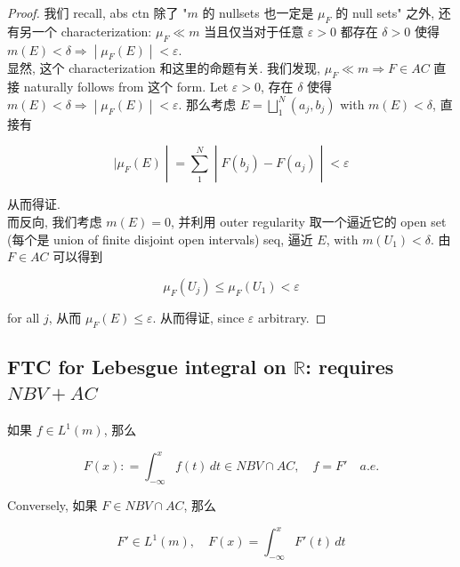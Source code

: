\begin{proof}

我们 recall, abs ctn 除了 "\(m\) 的 nullsets 也一定是 \(\mu_{F}\) 的 null sets" 之外, 还有另一个 characterization: \(\mu_{F} \ll m\) 当且仅当对于任意 \(\varepsilon > 0\) 都存在 \(\delta > 0\) 使得 \(\left. m(E) < \delta\Longrightarrow \middle| \mu_{F}(E) \middle| < \varepsilon \right.\).\\
显然, 这个 characterization 和这里的命题有关. 我们发现, \(\mu_{F} \ll m\Longrightarrow F \in AC\) 直接 naturally follows from 这个 form. Let \(\varepsilon > 0\), 存在 \(\delta\) 使得 \(\left. m(E) < \delta\Longrightarrow \middle| \mu_{F}(E) \middle| < \varepsilon \right.\). 那么考虑 \(E = \bigsqcup_{1}^{N}(a_{j},b_{j})\) with \(m(E) < \delta\), 直接有

\[\left. |\mu_{F}(E) \middle| = \sum\limits_{1}^{N} \middle| F(b_{j}) - F(a_{j}) \middle| < \varepsilon \right.\]

从而得证.\\
而反向, 我们考虑 \(m(E) = 0\), 并利用 outer regularity 取一个逼近它的 open set (每个是 union of finite disjoint open intervals) seq, 逼近 \(E\), with \(m(U_{1}) < \delta\). 由 \(F \in AC\) 可以得到

\[\mu_{F}(U_{j}) \leq \mu_{F}(U_{1}) < \varepsilon\]

for all \(j\), 从而 \(\mu_{F}(E) \leq \varepsilon\). 从而得证, since \(\varepsilon\) arbitrary.

\end{proof}

\subsection{\texorpdfstring{FTC for Lebesgue integral on \(\mathbb{R}\): requires \(NBV + AC\)}{FTC for Lebesgue integral on \textbackslash mathbb\{R\}: requires NBV + AC}}\label{ftc-for-lebesgue-integral-on-mathbbr-requires-nbv-ac}

\begin{corollary}

如果 \(f \in L^{1}(m)\), 那么

\[F(x): = \int_{- \infty}^{x}f(t)\, dt \in NBV \cap AC,\quad f = F'\quad a.e.\]

Conversely, 如果 \(F \in NBV \cap AC\), 那么

\[F' \in L^{1}(m),\quad F(x) = \int_{- \infty}^{x}F'(t)\, dt\]

\end{corollary}

